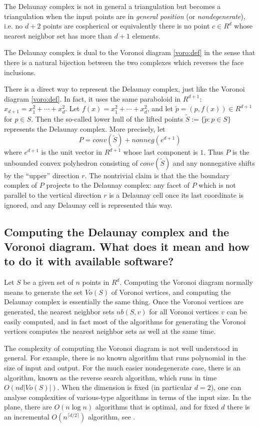 \documentclass[a4paper,12pt]{article}
\begin{document}
The Delaunay complex is not in general a triangulation
but becomes a triangulation when the input points are in
{\em general position} (or {\em nondegenerate}),
i.e. no $d+2$ points are cospherical or equivalently there is no
point $c\in R^d$ whose nearest neighbor set has more than $d+1$ elements.

The Delaunay complex is dual to the Voronoi diagram \ref{voro:def}
in the sense that there is a natural bijection between the
two complexes which reverses the face inclusions.

There is a direct way to represent the Delaunay complex, just like
the Voronoi diagram \ref{voro:def}.  In fact, it uses the same 
paraboloid in $R^{d+1}$:  $x_{d+1} = x_1^2 + \cdots + x_d^2$.
Let $f(x) = x_1^2 + \cdots + x_d^2$, and let $\tilde{p}= (p, f(x)) \in R^{d+1}$
for $p \in S$.    Then the so-called lower hull of the lifted points
 $\tilde{S}:=\{\tilde{p}:  p\in S\}$ represents the Delaunay complex.
More precisely, let  
\[
P =  conv(\tilde{S}) + nonneg(e^{d+1})
\]
where $e^{d+1}$ is the unit vector in $R^{d+1}$ whose last component is $1$.
Thus $P$ is the unbounded convex polyhedron
consisting of  $conv(\tilde{S})$ and
any nonnegative shifts by the ``upper'' direction $r$.
The nontrivial claim is that the the boundary complex of $P$ projects
to the Delaunay complex:  any facet of $P$ which is not parallel
to the vertical direction $r$ is a Delaunay cell once its last coordinate
is ignored, and any Delaunay cell is represented this way.

\subsection{Computing the Delaunay complex and the Voronoi diagram.  
What does it mean and how to do it with available software?}
\label{voro:computation}

Let $S$ be a given set of $n$ points in $R^d$.
Computing the Voronoi diagram normally means to generate
the set $Vo(S)$ of Voronoi vertices, and computing the Delaunay complex
is essentially the same thing.  Once the Voronoi vertices are
generated, the nearest neighbor sets $nb(S, v)$ for all Voronoi
vertices $v$ can be easily computed, and in fact most
of the algorithms for generating the Voronoi vertices
computes the nearest neighbor sets as well at the same time.

The complexity of computing the Voronoi diagram is not well
understood in general.   For example, there is no known
algorithm that runs polynomial in the size of input and output.
For the much easier nondegenerate case, there is an algorithm,
known as the reverse search algorithm, which runs
in time $O(n d |Vo(S)|)$.   When the dimension is fixed (in particular
$d=2$), one can analyse complexities of various-type algorithms
in terms of the input size.  In the plane, there are $O(n \log n)$
algorithms that is optimal,
and for fixed $d$ there is an incremental $O(n^{\lceil d/2 \rceil})$ algorithm,
see \cite[Chapter 20]{go-hbdcg-97}.
\end{document}
